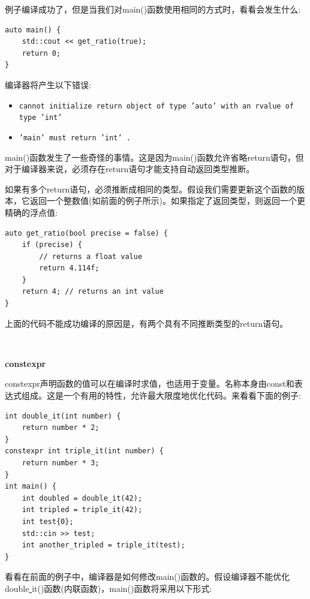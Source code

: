例子编译成功了，但是当我们对main()函数使用相同的方式时，看看会发生什么: \par

\begin{lstlisting}[caption={}]
auto main() {
	std::cout << get_ratio(true);
	return 0;
}
\end{lstlisting}

编译器将产生以下错误: \par

\begin{itemize}
	\item \texttt{cannot initialize return object of type 'auto' with an rvalue 	of type 'int'}
	\item \texttt{'main' must return 'int' .}
\end{itemize}

main()函数发生了一些奇怪的事情。这是因为main()函数允许省略return语句，但对于编译器来说，必须存在return语句才能支持自动返回类型推断。 \par
如果有多个return语句，必须推断成相同的类型。假设我们需要更新这个函数的版本，它返回一个整数值(如前面的例子所示)。如果指定了返回类型，则返回一个更精确的浮点值: \par

\begin{lstlisting}[caption={}]
auto get_ratio(bool precise = false) {
	if (precise) {
		// returns a float value
		return 4.114f;
	}
	return 4; // returns an int value
}
\end{lstlisting}

上面的代码不能成功编译的原因是，有两个具有不同推断类型的return语句。 \par

\noindent\textbf{}\ \par
\textbf{constexpr} \ \par
constexpr声明函数的值可以在编译时求值，也适用于变量。名称本身由const和表达式组成。这是一个有用的特性，允许最大限度地优化代码。来看看下面的例子: \par

\begin{lstlisting}[caption={}]
int double_it(int number) {
	return number * 2;
}
constexpr int triple_it(int number) {
	return number * 3;
}
int main() {
	int doubled = double_it(42);
	int tripled = triple_it(42);
	int test{0};
	std::cin >> test;
	int another_tripled = triple_it(test);
}
\end{lstlisting}

看看在前面的例子中，编译器是如何修改main()函数的。假设编译器不能优化double\underline{ }it()函数(内联函数)，main()函数将采用以下形式: \par

